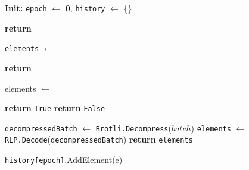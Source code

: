 \begin{figure}[t!]
  \begin{adjustbox}{minipage=[t]{\columnwidth}}
    \begin{algorithm}[H]
      \renewcommand{\thealgorithm}{ABCI Compresschain}         
      \caption{\small }%
      \label{alg:abci-brotli}%
      \small
      \begin{algorithmic}[1]
            \State \textbf{Init:} \texttt{epoch} $\leftarrow$ \textbf{0}, \texttt{history} $\leftarrow$ \{\}

            \label{alg:brotli_check_tx}
                \State \textbf{return} 
            \EndFunction
      
            \label{alg:brotli_deliver_tx}
				\State \texttt{elements} $\leftarrow$ 
				\State {}
            		
            		\State \textbf{return}
            \EndFunction
            
            \label{alg:brotli_is_valid}
            		\State elements $\leftarrow$ 
            		
                    		\State \textbf{return} \texttt{True}
                    \EndIf
                \EndFor
                \State \textbf{return} \texttt{False}
            \EndFunction
            
            \label{alg:brotli_get_element}
                \State \texttt{decompressedBatch} $\leftarrow$ \texttt{Brotli.Decompress}($batch$)
                \State \texttt{elements} $\leftarrow$ \texttt{RLP.Decode}(\texttt{decompressedBatch})
                \State \textbf{return} \texttt{elements}
            \EndFunction
            
            \label{alg:brotli_new_epoch}
                				\State \texttt{history[epoch]}.AddElement(e)
                    	 \EndIf
                	\EndFor
                	

\end{algorithmic}
\end{algorithm}
\end{adjustbox}
\end{figure}
